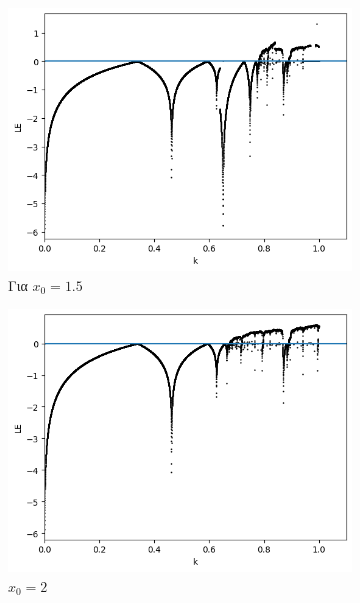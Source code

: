 \begin{figure}[ht]
	\centering

	\begin{subfigure}[b]{0.7\textwidth}
		\centering
		\includegraphics[width=\textwidth]{LateX images/graphs q16/g10}
		\caption{Για \(x_0=1.5\)}
		\label{f:g36}
		\end{subfigure}
		\hfill
	\begin{subfigure}[b]{0.7\textwidth}
		\centering
		\includegraphics[width=\textwidth]{LateX images/graphs q16/g11}
		\caption{\(x_0=2\)}
		\label{f:g37}
	\end{subfigure}
	\hfill
	\begin{subfigure}[b]{0.7\textwidth}

\end{subfigure}
\end{figure}
